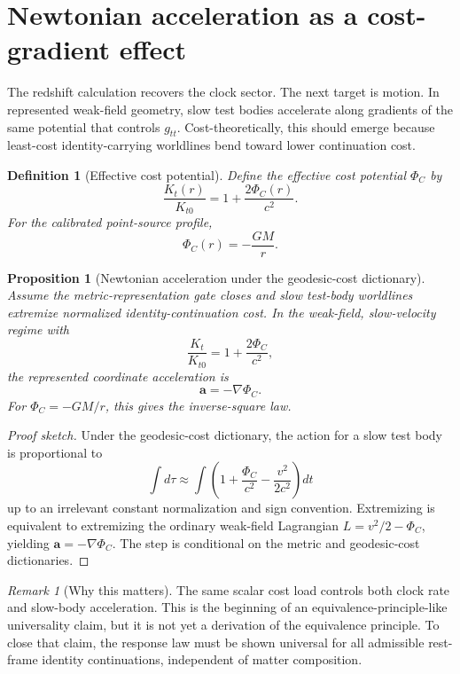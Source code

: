\documentclass[11pt]{article}
\newtheorem{proposition}[theorem]{Proposition}
\newtheorem{definition}[theorem]{Definition}
\theoremstyle{remark}
\newtheorem{remark}[theorem]{Remark}
\begin{document}
\section{Newtonian acceleration as a cost-gradient effect}

The redshift calculation recovers the clock sector.  The next target is motion.  In represented weak-field geometry, slow test bodies accelerate along gradients of the same potential that controls \(g_{tt}\).  Cost-theoretically, this should emerge because least-cost identity-carrying worldlines bend toward lower continuation cost.

\begin{definition}[Effective cost potential]
Define the effective cost potential \(\Phi_C\) by
\[
        \frac{K_t(r)}{K_{t0}}=1+\frac{2\Phi_C(r)}{c^2}.
\]
For the calibrated point-source profile,
\[
        \Phi_C(r)=-\frac{GM}{r}.
\]
\end{definition}

\begin{proposition}[Newtonian acceleration under the geodesic-cost dictionary]
Assume the metric-representation gate closes and slow test-body worldlines extremize normalized identity-continuation cost.  In the weak-field, slow-velocity regime with
\[
        \frac{K_t}{K_{t0}}=1+\frac{2\Phi_C}{c^2},
\]
the represented coordinate acceleration is
\[
        \mathbf a=-\nabla\Phi_C.
\]
For \(\Phi_C=-GM/r\), this gives the inverse-square law.
\end{proposition}

\begin{proof}[Proof sketch]
Under the geodesic-cost dictionary, the action for a slow test body is proportional to
\[
        \int d\tau
        \approx
        \int \left(1+\frac{\Phi_C}{c^2}-\frac{v^2}{2c^2}\right)dt
\]
up to an irrelevant constant normalization and sign convention.  Extremizing is equivalent to extremizing the ordinary weak-field Lagrangian \(L=v^2/2-\Phi_C\), yielding \(\mathbf a=-\nabla\Phi_C\).  The step is conditional on the metric and geodesic-cost dictionaries.
\end{proof}

\begin{remark}[Why this matters]
The same scalar cost load controls both clock rate and slow-body acceleration.  This is the beginning of an equivalence-principle-like universality claim, but it is not yet a derivation of the equivalence principle.  To close that claim, the response law must be shown universal for all admissible rest-frame identity continuations, independent of matter composition.
\end{remark}
\end{document}
